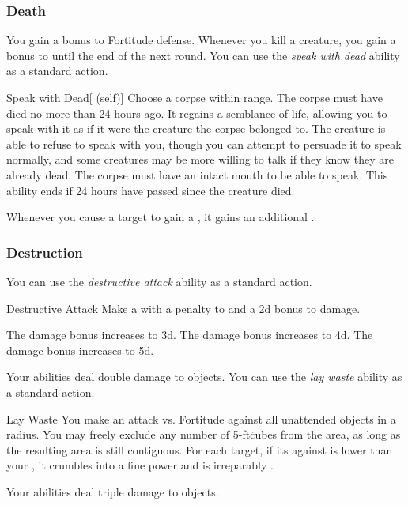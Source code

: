         \subsubsection{Death}
             You gain a  bonus to Fortitude defense.
             Whenever you kill a creature, you gain a  bonus to  until the end of the next round.
             You can use the \textit{speak with dead} ability as a standard action.
            \begin{attuneability}{Speak with Dead}[ (self)]
                Choose a corpse within \rngclose range.
                The corpse must have died no more than 24 hours ago.
                It regains a semblance of life, allowing you to speak with it as if it were the creature the corpse belonged to.
                The creature is able to refuse to speak with you, though you can attempt to persuade it to speak normally, and some creatures may be more willing to talk if they know they are already dead.
                The corpse must have an intact mouth to be able to speak.
                This ability ends if 24 hours have passed since the creature died.
            \end{attuneability}
             Whenever you cause a target to gain a , it gains an additional .

        \subsubsection{Destruction}
             You can use the \textit{destructive attack} ability as a standard action.
            \begin{freeability}{Destructive Attack}
                Make a  with a  penalty to  and a \plus2d bonus to damage.

                \rankline
                 The damage bonus increases to \plus3d.
                 The damage bonus increases to \plus4d.
                 The damage bonus increases to \plus5d.
            \end{freeability}
             Your abilities deal double damage to objects.
             You can use the \textit{lay waste} ability as a standard action.
            \begin{freeability}{Lay Waste}
                You make an attack vs. Fortitude against all unattended objects in a \arealarge radius.
                You may freely exclude any number of 5-ft\. cubes from the area, as long as the resulting area is still contiguous.
                \hit For each target, if its  against  is lower than your , it crumbles into a fine power and is irreparably .
            \end{freeability}
             Your abilities deal triple damage to objects.

